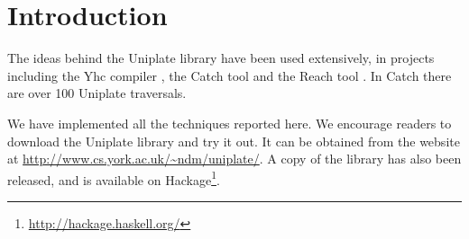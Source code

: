 
\chapter{Introduction}



\cite{haskell} 


The ideas behind the Uniplate library have been used extensively, in projects including the Yhc compiler \citep{me:yhc_core}, the Catch tool \citep{me:catch_tfp} and the Reach tool \cite{naylor:reach}. In Catch there are over 100 Uniplate traversals.

We have implemented all the techniques reported here. We encourage readers to download the Uniplate library and try it out. It can be obtained from the website at \url{http://www.cs.york.ac.uk/~ndm/uniplate/}. A copy of the library has also been released, and is available on Hackage\footnote{\url{http://hackage.haskell.org/}}.

